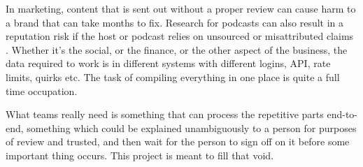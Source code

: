In marketing, content that is sent out without a proper review can cause harm to a brand that can take months to fix. Research for podcasts can also result in a reputation risk if the host or podcast relies on unsourced or misattributed claims \cite{marketingfm,cove}. Whether it's the social, or the finance, or the other aspect of the business, the data required to work is in different systems with different logins, API, rate limits, quirks etc. The task of compiling everything in one place is quite a full time occupation.

What teams really need is something that can process the repetitive parts end-to-end, something which could be explained unambiguously to a person for purposes of review and trusted, and then wait for the person to sign off on it before some important thing occurs. This project is meant to fill that void.

